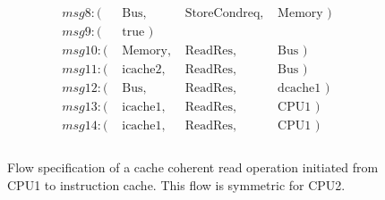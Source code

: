 \documentclass[12pt,frontmatter,copyright,thesis]{usfmanus}
\begin{document}
\begin{appendix}
\begin{figure}
\begin{minipage}{.5\textwidth}
{\[ \]}
 \end{minipage}%
 \begin{minipage}{.5\textwidth}
  {\footnotesize
 \[
 \begin{array}{llll}
 msg8: (&\mbox{ Bus},&\mbox{ StoreCondreq},&\mbox{ Memory })\\
 msg9: (&\mbox{ true                                        })\\
 msg10: (&\mbox{ Memory},&\mbox{ ReadRes},&\mbox{ Bus            })\\    
 msg11: (&\mbox{ icache2},&\mbox{ ReadRes},&\mbox{ Bus })\\
 msg12: (&\mbox{ Bus},&\mbox{ ReadRes},&\mbox{ dcache1      })\\            
 msg13: (&\mbox{ icache1},&\mbox{ ReadRes},&\mbox{ CPU1          })\\  
 msg14: (&\mbox{ icache1},&\mbox{ ReadRes},&\mbox{ CPU1 })\\\\
 \end{array}
 \]}
 \end{minipage}
 \caption{\footnotesize Flow specification of a cache coherent read operation initiated from CPU1 to instruction cache. \footnotesize This flow is symmetric for CPU2. }
 \label{read-flow} 
 \end{figure}
 

\end{appendix}
\end{document}
